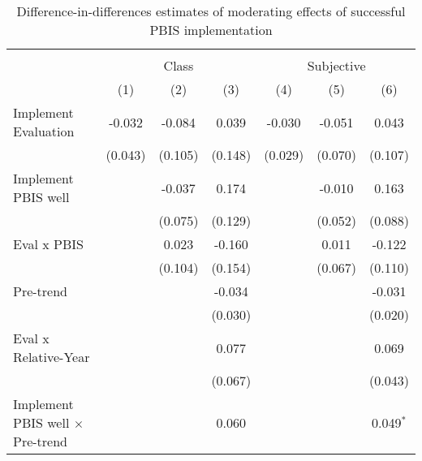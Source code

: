 
\begin{table}[!htbp]
   \caption{\label{tab:pbis} Difference-in-differences estimates of moderating effects of successful PBIS implementation}
   \bigskip
   \centering
   \begin{tabular}{lcccccc}
      \hline \hline \\[-1.8ex]
       & \multicolumn{3}{c}{Class} & \multicolumn{3}{c}{Subjective}\\
                                              & (1)           & (2)           & (3)           & (4)           & (5)           & (6)\\  
      \midrule 
      Implement Evaluation                    & -0.032        & -0.084        & 0.039         & -0.030        & -0.051        & 0.043\\   
                                              & (0.043)       & (0.105)       & (0.148)       & (0.029)       & (0.070)       & (0.107)\\   
      Implement PBIS well                     &               & -0.037        & 0.174         &               & -0.010        & 0.163\\   
                                              &               & (0.075)       & (0.129)       &               & (0.052)       & (0.088)\\   
      Eval x PBIS                             &               & 0.023         & -0.160        &               & 0.011         & -0.122\\   
                                              &               & (0.104)       & (0.154)       &               & (0.067)       & (0.110)\\   
      Pre-trend                               &               &               & -0.034        &               &               & -0.031\\   
                                              &               &               & (0.030)       &               &               & (0.020)\\   
      Eval x Relative-Year                    &               &               & 0.077         &               &               & 0.069\\   
                                              &               &               & (0.067)       &               &               & (0.043)\\   
      Implement PBIS well $\times$ Pre-trend  &               &               & 0.060         &               &               & 0.049$^{*}$\\   

\end{tabular}
\end{table}
